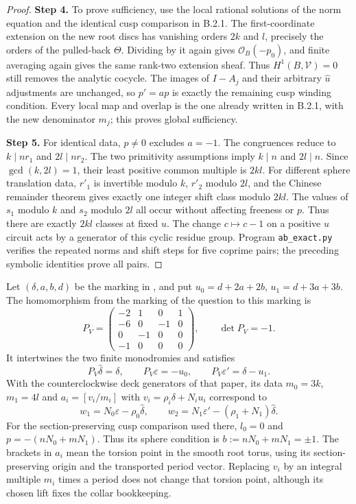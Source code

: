 \begin{proof}
\par\smallskip\noindent\textbf{Step 4.} To prove sufficiency, use the local rational solutions of the norm equation and the identical cusp comparison in B.2.1. The first-coordinate extension on the new root discs has vanishing orders $2k$ and $l$, precisely the orders of the pulled-back $\Theta$. Dividing by it again gives $\mathcal O_B(-p_0)$, and finite averaging again gives the same rank-two extension sheaf. Thus $H^1(B,\mathcal V)=0$ still removes the analytic cocycle. The images of $I-A_j$ and their arbitrary $\widehat u$ adjustments are unchanged, so $p'=ap$ is exactly the remaining cusp winding condition. Every local map and overlap is the one already written in B.2.1, with the new denominator $m_j$; this proves global sufficiency.

\par\smallskip\noindent\textbf{Step 5.} For identical data, $p\ne0$ excludes $a=-1$. The congruences reduce to $k\mid nr_1$ and $2l\mid nr_2$. The two primitivity assumptions imply $k\mid n$ and $2l\mid n$. Since $\gcd(k,2l)=1$, their least positive common multiple is $2kl$. For different sphere translation data, $r'_1$ is invertible modulo $k$, $r'_2$ modulo $2l$, and the Chinese remainder theorem gives exactly one integer shift class modulo $2kl$. The values of $s_1$ modulo $k$ and $s_2$ modulo $2l$ all occur without affecting freeness or $p$. Thus there are exactly $2kl$ classes at fixed $u$. The change $c\mapsto c-1$ on a positive $u$ circuit acts by a generator of this cyclic residue group. Program \texttt{ab\_exact.py} verifies the repeated norms and shift steps for five coprime pairs; the preceding symbolic identities prove all pairs.
\end{proof}
\begin{announcement}[PUSH E.1.1; A]\label{push:E.1.1}
Let $(\delta,a,b,d)$ be the marking in
\cite[Section 2, equations (2.1), (2.2), (2.7), (2.11)--(2.12)]{VL26},
and put $u_0=d+2a+2b$, $u_1=d+3a+3b$.
The homomorphism from the marking of the question to this marking is
\[
 P_V=\begin{pmatrix}
 -2&1&0&1\\-6&0&-1&0\\0&-1&0&0\\-1&0&0&0
 \end{pmatrix},\qquad \det P_V=-1.
\]
It intertwines the two finite monodromies and satisfies
\[
 P_V\widehat\delta=\delta,\qquad
 P_V\varepsilon=-u_0,\qquad
 P_V\varepsilon'=\delta-u_1.
\]
With the counterclockwise deck generators of that paper, its data
$m_0=3k$, $m_1=4l$ and
$a_i=[v_i/m_i]$ with $v_i=\rho_i\delta+N_i u_i$ correspond to
\[
 w_1=N_0\varepsilon-\rho_0\widehat\delta,
 \qquad
 w_2=N_1\varepsilon'-(\rho_1+N_1)\widehat\delta.
\]
For the section-preserving cusp comparison used there, $l_0=0$ and
$p=-(nN_0+mN_1)$.  Thus its sphere condition is
$b:=nN_0+mN_1=\pm1$.
The brackets in $a_i$ mean the torsion point in the smooth
root torus, using its section-preserving origin and the
transported period vector.  Replacing $v_i$ by an integral
multiple $m_i$ times a period does not change that torsion
point, although its chosen lift fixes the collar bookkeeping.
\end{announcement}
